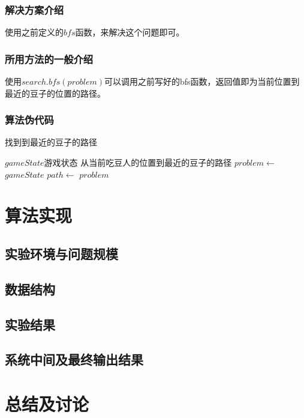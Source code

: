 \documentclass[forprint]{WHUBachelor}
\begin{document}
\subsection{解决方案介绍}

使用之前定义的$bfs$函数，来解决这个问题即可。

\subsection{所用方法的一般介绍}

使用$search.bfs(problem)$可以调用之前写好的bfs函数，返回值即为当前位置到最近的豆子的位置的路径。

\subsection{算法伪代码}

\begin{algorithm}[H]
  \caption{找到到最近的豆子的路径}
  \begin{algorithmic}[1] %
    \Require $gameState$游戏状态
    \Ensure 从当前吃豆人的位置到最近的豆子的路径
    \State $problem \gets $  {$gameState$}
    \State $path \gets $  {$problem$}
    \State {}
  \end{algorithmic}
\end{algorithm}

\chapter{算法实现}

\section{实验环境与问题规模}

\section{数据结构}

\section{实验结果}

\section{系统中间及最终输出结果}

\chapter{总结及讨论}
\end{document}
